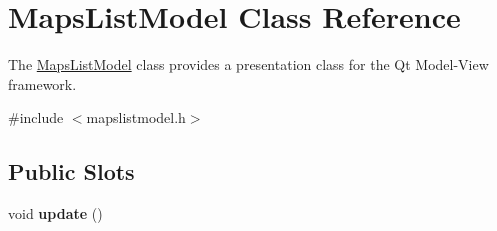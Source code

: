 \hypertarget{class_maps_list_model}{\section{\-Maps\-List\-Model \-Class \-Reference}
\label{class_maps_list_model}
}


\-The \hyperlink{class_maps_list_model}{\-Maps\-List\-Model} class provides a presentation class for the \-Qt \-Model-\/\-View framework.  




{\ttfamily \#include $<$mapslistmodel.\-h$>$}

\subsection*{\-Public \-Slots}
\begin{DoxyCompactItemize}
\item 
\hypertarget{class_maps_list_model_aa08107d25efb1fd559d054751f148a3f}{void {\bfseries update} ()}\label{class_maps_list_model_aa08107d25efb1fd559d054751f148a3f}

\end{DoxyCompactItemize}
